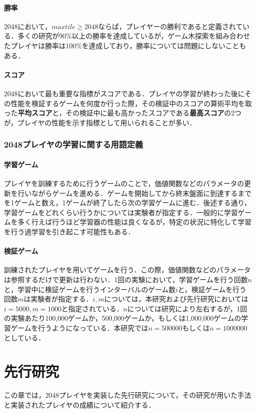 \documentclass{suribt}
\begin{document}
\subsubsection{勝率}
2048において，$max tile \geq 2048$ならば，プレイヤーの勝利であると定義されている．多くの研究が90\%以上の勝率を達成しているが，ゲーム木探索を組み合わせたプレイヤは勝率は100\%を達成しており，勝率については問題にしないこともある．

\subsubsection{スコア}
2048において最も重要な指標がスコアである．プレイヤの学習が終わった後にその性能を検証するゲームを何度か行った際，その検証中のスコアの算術平均を取った\textbf{平均スコア}と，その検証中に最も高かったスコアである\textbf{最高スコア}の2つが，プレイヤの性能を示す指標として用いられることが多い．

\subsection{2048プレイヤの学習に関する用語定義}
\subsubsection{学習ゲーム}
プレイヤを訓練するために行うゲームのことで，価値関数などのパラメータの更新を行いながらゲームを進める．ゲームを開始してから終末盤面に到達するまでを1ゲームと数え，1ゲームが終了したら次の学習ゲームに進む．後述する通り，学習ゲームをどれくらい行うかについては実験者が指定する．一般的に学習ゲームを多く行えば行うほど学習器の性能は良くなるが，特定の状況に特化して学習を行う過学習を引き起こす可能性もある\cite{Yeh}．

\subsubsection{検証ゲーム}
訓練されたプレイヤを用いてゲームを行う．この際，価値関数などのパラメータは参照するだけで更新は行わない．1回の実験において，学習ゲームを行う回数$n$と，学習中に検証ゲームを行うインターバルのゲーム数$i$と，検証ゲームを行う回数$m$は実験者が指定する．$i,m$については，本研究および先行研究においては$i=5000, m=1000$と指定されている．$n$については研究により左右するが，1回の実験あたり100,000ゲームか，500,000ゲームか，もしくは1,000,000ゲームの学習ゲームを行うようになっている．本研究では$n=500000$もしくは$n=1000000$としている．

\chapter{先行研究}
この章では，2048プレイヤを実装した先行研究について，その研究が用いた手法と実装されたプレイヤの成績について紹介する．
\end{document}
